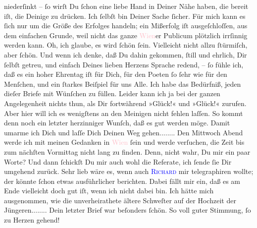                niederſinkt – ſo wirſt Du ſchon eine liebe Hand in Deiner Nähe haben, die bereit iſt,
               die Deinige zu drücken. Ich ſelbſt bin Deiner Sache ſicher.  Für mich kann es ſich nur um die Größe des Erfolges handeln; ein Mißerfolg iſt
               ausgeſchloſſen,  aus dem einfachen Grunde, weil nicht das ganze \textcolor{pink}{Wien}{}\ledrightnote{\textcolor{pink}{Wien}}er Publicum plötzlich irrſinnig werden kann. Oh, ich glaube, es wird
               ſchön ſein. Vielleicht nicht allzu ſtürmiſch, aber ſchön. Und wenn ich denke, {\pb}daß Du dahin gekommen, ſtill und ehrlich, Dir  ſelbſt getreu, und einfach Deines lieben Herzens
               Sprache redend, – ſo fühle ich, daß es ein hoher Ehrentag iſt für Dich, für den Poeten ſo ſehr wie für den Menſchen, und
               ein ſtarkes Beiſpiel für uns Alle. Ich habe das Bedürfniß, jeden dieſer Briefe mit
               Wünſchen zu füllen. Leider kann ich ja bei der ganzen Angelegenheit nichts thun, als
               Dir fortwährend »Glück!« und »Glück!« zurufen. Aber hier will ich es wenigſtens an
               den Meinigen nicht {\pb}fehlen laſſen. So kommt denn
               noch ein letzter herzinniger Wunſch, daß es gut werden möge. Damit umarme ich Dich
               und laſſe Dich Deinen Weg gehen........\pend
           \pstart
           Den Mittwoch{ }Abend werde ich mit meinen Gedanken in \textcolor{pink}{Wien}{}\ledrightnote{\textcolor{pink}{Wien}} ſein und werde verſuchen, die Zeit bis zum nächſten
                  Vormittag nicht lang zu finden. Denn, nicht wahr, Du \label{K_L02750-2v}\label{K_L02750-2h} mir ein paar Worte? Und dann ſchickſt Du mir auch wohl die
               Referate, ich ſende {\pb}ſie Dir umgehend zurück. Sehr
               lieb wäre es, wenn auch \textsc{\textcolor{blue}{Richard}{}\ledrightnote{\textcolor{blue}{Richard Beer-Hofmann}}} mir telegraphiren wollte; der könnte ſchon etwas ausführlicher berichten.\pend
           \pstart
           Dabei fällt mir ein, daß es am Ende vielleicht doch gut iſt, wenn ich nicht dabei
               bin. Ich hätte mich ausgenommen, wie die unverheirathete ältere Schweſter auf der
               Hochzeit der Jüngeren........\pend
           \pstart
           Dein letzter Brief war beſonders ſchön. So voll guter Stimmung, ſo zu Herzen gehend!
